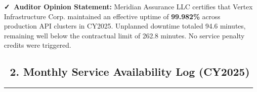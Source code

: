 \documentclass[11pt,a4paper]{scrartcl}
\begin{document}
\vspace{2pt}

\begin{tcolorbox}[
    enhanced,
    colback=lightbg,
    colframe=tealaccent,
    arc=3pt,
    boxrule=0.5pt,
    leftrule=4pt,
    left=8pt, right=8pt, top=4pt, bottom=4pt
]
    \textcolor{navyblue}{\textbf{\faCheck\ Auditor Opinion Statement:}} \small Meridian Assurance LLC certifies that Vertex Infrastructure Corp. maintained an effective uptime of \textbf{99.982\%} across production API clusters in CY2025. Unplanned downtime totaled 94.6 minutes, remaining well below the contractual limit of 262.8 minutes. No service penalty credits were triggered.
\end{tcolorbox}

\vspace{2pt}

\subsection*{\textcolor{navyblue}{\faCalendar\ 2. Monthly Service Availability Log (CY2025)}}
\hrule
\vspace{2pt}
\end{document}
